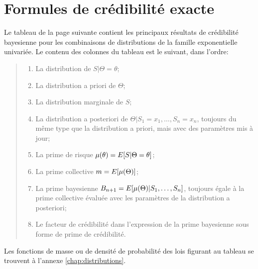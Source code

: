 \chapter{Formules de crédibilité exacte}
\label{chap:formules}

Le tableau de la page suivante contient les principaux résultats de
crédibilité bayesienne pour les combinaisons de distributions de la
famille exponentielle univariée. Le contenu des colonnes du tableau
est le suivant, dans l'ordre:
\begin{quote}
  \begin{enumerate}
  \item La distribution de $S|\Theta = \theta$;
  \item La distribution a priori de $\Theta$;
  \item La distribution marginale de $S$;
  \item La distribution a posteriori de $\Theta|S_1 = x_1, \dots, S_n
    = x_n$, toujours du même type que la distribution a priori, mais
    avec des paramètres mis à jour;
  \item La prime de risque $\mu(\theta) = E [ S|\Theta = \theta ]$;
  \item La prime collective $m = E [ \mu(\Theta) ]$;
  \item La prime bayesienne $B_{n+1} = E [ \mu(\Theta)|S_1, \dots,
      S_n ]$, toujours égale à la prime collective évaluée avec les
    paramètres de la distribution a posteriori;
  \item Le facteur de crédibilité dans l'expression de la prime
    bayesienne sous forme de prime de crédibilité.
  \end{enumerate}
\end{quote}

Les fonctions de masse ou de densité de probabilité des lois figurant
au tableau se trouvent à l'annexe \ref{chap:distributions}.

\newpage

